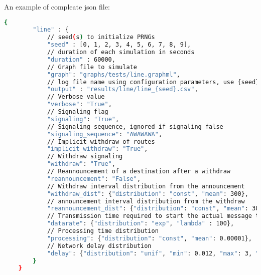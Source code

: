 \documentclass[10pt,journal,onecolumn]{IEEEtran}
\begin{document}
An example of compleate json file:
\renewcommand{\lstlistingname}{Conf file}
\begin{lstlisting}[language=bash, caption=Example of json file, label=json:line_example]
	{                                                                               
	    "line" : {                                                                  
	        // seed(s) to initialize PRNGs                                          
	        "seed" : [0, 1, 2, 3, 4, 5, 6, 7, 8, 9],                                
	        // duration of each simulation in seconds                               
	        "duration" : 60000,                                                     
	        // Graph file to simulate                                               
	        "graph": "graphs/tests/line.graphml",    
	        // log file name using configuration parameters, use {seed} or {date-time}
	        "output" : "results/line/line_{seed}.csv",
	        // Verbose value                                                        
	        "verbose": "True",                                                      
	        // Signaling flag                                                       
	        "signaling": "True",                                                    
	        // Signaling sequence, ignored if signaling false                       
	        "signaling_sequence": "AWAWAWA",                                        
	        // Implicit withdraw of routes                                          
	        "implicit_withdraw": "True",                                            
	        // Withdraw signaling                                                   
	        "withdraw": "True",                                                     
	        // Reannouncement of a destination after a withdraw                     
	        "reannouncement": "False",                                              
	        // Withdraw interval distribution from the announcement                 
	        "withdraw_dist": {"distribution": "const", "mean": 300},                
	        // announcement interval distribution from the withdraw                 
	        "reannouncement_dist": {"distribution": "const", "mean": 300},          
	        // Transmission time required to start the actual message transmission  
	        "datarate": {"distribution": "exp", "lambda" : 100},                    
	        // Processing time distribution                                         
	        "processing": {"distribution": "const", "mean": 0.00001},               
	        // Network delay distribution                                           
	        "delay": {"distribution": "unif", "min": 0.012, "max": 3, "int": 0.001} 
	    }                                                                           
	}   
\end{lstlisting}
\end{document}
